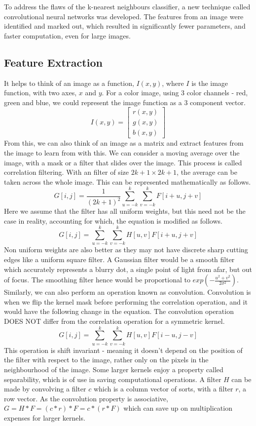 \documentclass{article}
\begin{document}
To address the flaws of the k-nearest neighbours classifier, a new technique called convolutional neural networks was developed. The features from an image were identified and marked out, which resulted in significantly fewer parameters, and faster computation, even for large images.

\subsection{Feature Extraction}

It helps to think of an image as a function, $I(x, y)$, where $I$ is the image function, with two axes, $x$ and $y$. For a color image, using 3 color channels - red, green and blue, we could represent the image function as a 3 component vector. 
$$I(x, y) = \begin{bmatrix}
r(x, y)\\g(x, y)\\b(x, y)
\end{bmatrix}$$
From this, we can also think of an image as a matrix and extract features from the image to learn from with this. We can consider a moving average over the image, with a mask or a filter that slides over the image. This process is called correlation filtering. With an filter of size $2k+1 \times 2k+1$, the average can be taken across the whole image. This can be represented mathematically as follows.
$$G[i, j] = \frac{1}{(2k+1)^2} \sum_{u=-k}^k \sum_{v=-k}^k F[i+u, j+v]$$
Here we assume that the filter has all uniform weights, but this need not be the case in reality, accounting for which, the equation is modified as follows. 
$$G[i, j] = \sum_{u=-k}^k \sum_{v=-k}^k H[u, v] F[i+u, j+v]$$
Non uniform weights are also better as they may not have discrete sharp cutting edges like a uniform square filter. A Gaussian filter would be a smooth filter which accurately represents a blurry dot, a single point of light from afar, but out of focus. The smoothing filter hence would be proportional to $exp(- \frac{u^2 + v^2}{2 \sigma ^2})$.
Similarly, we can also perform an operation known as convolution. Convolution is when we flip the kernel mask before performing the correlation operation, and it would have the following change in the equation. The convolution operation DOES NOT differ from the correlation operation for a symmetric kernel. 
$$G[i, j] = \sum_{u=-k}^k \sum_{v=-k}^k H[u, v] F[i-u, j-v]$$
This operation is shift invariant - meaning it doesn't depend on the position of the filter with respect to the image, rather only on the pixels in the neighbourhood of the image. Some larger kernels enjoy a property called separability, which is of use in saving computational operations. A filter $H$ can be made by convolving a filter $c$ which is a column vector of sorts, with a filter $r$, a row vector. As the convolution property is associative, $G = H*F = (c*r)*F = c*(r*F)$ which can save up on multiplication expenses for larger kernels.
\end{document}
